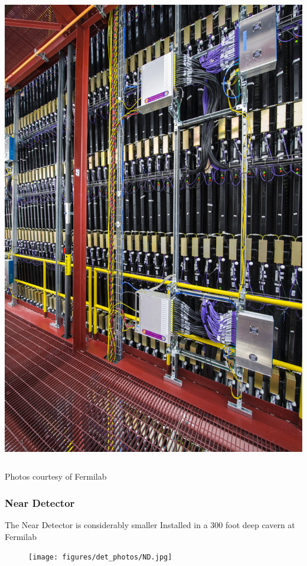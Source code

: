 \documentclass[10pt,professionalfonts,xcolor=table]{beamer}
\begin{document}
{\begin{columns}[c]
\centering
 \includegraphics[height=0.85\textheight]{figures/det_photos/det_side.jpg}
\end{columns}
\gap
{\scriptsize Photos courtesy of Fermilab}


}

\frame
{
  \frametitle{Near Detector}
    \begin{itemize}
	\bang The Near Detector is considerably smaller
	\bang Installed in a 300 foot deep cavern at Fermilab

\end{itemize}
	\begin{figure} \texttt{[image: figures/det\_photos/ND.jpg]} \end{figure}
}
\end{document}
